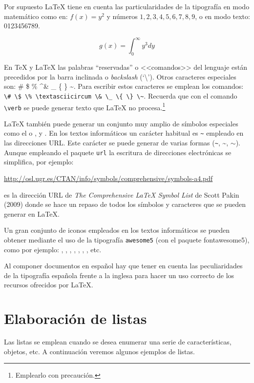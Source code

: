 \documentclass[ 		%
	11pt,				%
	a4paper,			%
	twoside,			%
	openright,			%
	final       		%
]{book}
\begin{document}
Por supuesto \LaTeX{} tiene en cuenta las particularidades de la tipografía en modo matemático como en: $f(x)=y^2$ y números $1,2,3,4,5,6,7,8,9$, o en modo texto: 0123456789.

$$g(x)=\int_{0}^{\infty}y^{3}dy$$

En \TeX{} y \LaTeX{} las palabras ``reservadas'' o <<comandos>> del lenguaje están precedidos por la barra inclinada o \emph{backslash} (`\textbackslash'). Otros caracteres especiales son: \# \$ \% \textasciicircum \& \_ \{ \} \~{}. Para escribir estos caracteres se emplean los comandos:
\verb!\# \$ \% \textasciicircum \& \_ \{ \} \~!. Recuerda que con el comando \verb+\verb+ se puede generar texto que \LaTeX{} no procesa.\footnote{Emplearlo con precaución.}

\LaTeX{} también puede generar un conjunto muy amplio de símbolos especiales como el \EUR{} o \texteuro,  y \Coffeecup. En los textos informáticos un carácter habitual es \verb+~+ empleado en las direcciones URL. Este carácter se puede generar de varias formas (\verb+~+, \~{}, $\sim$). Aunque empleando el paquete \texttt{url} la escritura de direcciones electrónicas se simplifica, por ejemplo:

\url{http://osl.ugr.es/CTAN/info/symbols/comprehensive/symbols-a4.pdf}

\noindent es la dirección URL de \emph{The Comprehensive \LaTeX{} Symbol List} de Scott Pakin (2009) donde se hace un repaso de todos los símbolos y caracteres que se pueden generar en \LaTeX{}.

Un gran conjunto de iconos empleados en los textos informáticos se pueden obtener mediante el uso de la tipografía \texttt{awesome5} (con el paquete fontawesome5), como por ejemplo: \faNodeJs, \faNode, \faGooglePlay, \faInternetExplorer, \faGithub, \faGit*, \faWhatsapp, etc.

Al componer documentos en español hay que tener en cuenta las peculiaridades de la tipografía española frente a la inglesa para hacer un uso correcto de los recursos ofrecidos por \LaTeX.














\chapter{Elaboración de listas}
Las listas se emplean cuando se desea enumerar una serie de características, objetos, etc. A continuación veremos algunos ejemplos de listas.
\end{document}
